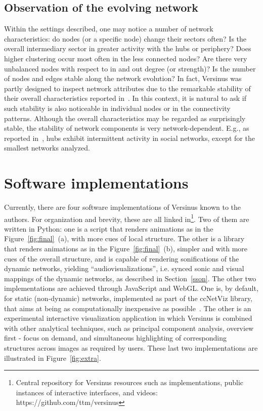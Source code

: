 \documentclass[runningheads]{llncs}
\begin{document}
\subsection{Observation of the evolving network}
Within the settings described, one may notice a number of network characteristics: do nodes (or a specific node) change their sectors often? Is the overall intermediary sector in greater activity with the hubs or periphery?
Does higher clustering occur most often in the less connected nodes?
Are there very unbalanced nodes with respect to in and out degree (or strength)?
Is the number of nodes and edges stable along the network evolution?
In fact, Versinus was partly designed to inspect network attributes due to the remarkable stability of their overall characteristics reported in~\cite{stab}.
In this context, it is natural to ask if such stability is also noticeable in individual nodes or in the connectivity patterns. Although the overall characteristics may be regarded as surprisingly stable, the stability of network components is very network-dependent. E.g., as reported in~\cite{barabasiEvo}, hubs exhibit intermittent activity in social networks, except for the smallest networks analyzed.

\section{Software implementations}\label{sec:imp}
Currently, there are four software implementations of Versinus known to the authors.
For organization and brevity, these are all linked in\footnote{Central repository for Versinus resources such as implementations, public instances of interactive interfaces, and videos: https://github.com/ttm/versinus}. 
Two of them are written in Python: one is a script that renders animations as in the Figure~\ref{fig:final}~(a),
with more cues of local structure. The other is a library that renders animations as in the Figure~\ref{fig:final}~(b), simpler and with more cues of the overall structure, and is capable of rendering sonifications of the dynamic networks, yielding ``audiovisualizations'', i.e. synced sonic and visual mappings of the dynamic networks, as described in Section~\ref{sson}.
The other two implementations are achieved through JavaScript and WebGL.
One is, by default, for static (non-dynamic) networks, implemented as part of the ccNetViz library, that aims at being as computationally inexpensive as possible~\cite{cell}.
The other is an experimental interactive visualization application in which Versinus is combined with other analytical techniques,
such as principal component analysis, overview first - focus on demand, and simultaneous highlighting of corresponding structures across images as required by users.
These last two implementations are illustrated in Figure~\ref{fig:extra}.
\end{document}
